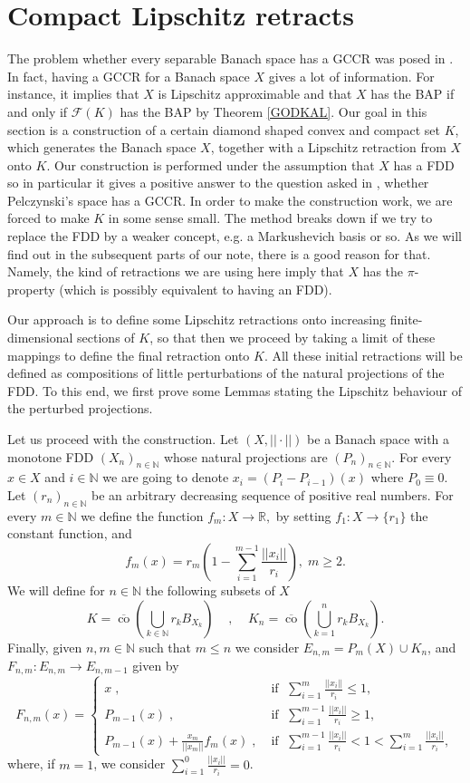 \documentclass[11pt]{amsart}
\newcommand{\N}{\mathbb{N}}
\newcommand{\R}{\mathbb{R}}
\DeclareMathOperator{\co}{co}
\renewcommand{\geq}{\geqslant}
\renewcommand{\leq}{\leqslant}
\newcommand{\<}{\langle}
\renewcommand{\>}{\rangle}
\theoremstyle{definition}
\theoremstyle{remark}
\numberwithin{equation}{section}
\def\R{{\mathbb R}}
\begin{document}
\section{Compact Lipschitz retracts}\label{secretr}

The problem whether every separable Banach space has a GCCR
was posed in \cite{GO14}. In fact, having a GCCR for a Banach space $X$ gives a lot of information. For instance, it implies that $X$ is Lipschitz approximable and that $X$ has the BAP if and only if $\mathcal{F}(K)$ has the BAP by Theorem \ref{GODKAL}. Our goal in this section is a construction of a certain diamond shaped convex and compact set $K$, which generates the Banach space $X$, together with a Lipschitz retraction from $X$ onto $K$. Our construction is performed
under the assumption that $X$ has a FDD so in particular it gives a positive answer to the question asked in \cite{GP19}, whether Pelczynski's space has a GCCR. In order to make the construction work, we
are forced to make $K$ in some sense small. The method breaks down if we try to replace the FDD by
a weaker concept, e.g. a Markushevich basis or so. As we will find out in the subsequent parts of
our note, there is a good reason for that. Namely, the kind of retractions we are using here
imply that $X$ has the $\pi$-property (which is possibly equivalent to having an FDD).

Our approach is to define some Lipschitz retractions onto increasing finite-dimensional sections of $K$, so that then we proceed by taking a limit of these mappings to define the final retraction onto $K$. All these initial retractions will be defined as compositions of little perturbations of the natural projections of the FDD. To this end, we first prove some Lemmas stating the Lipschitz behaviour of the perturbed projections.

Let us proceed with the construction.
Let $(X,||\cdot||)$ be a Banach space with a monotone FDD  $(X_n)_{n\in\N}$ whose natural projections are $(P_n)_{n\in\N}$. For every $x\in X$ and $i\in\N$ we are going to denote $x_i=(P_i-P_{i-1})(x)$ where $P_0\equiv 0$. Let $(r_n)_{n\in \N}$ be an arbitrary decreasing sequence of positive real numbers. For every $m\in\N$  we define the function $f_m:X\rightarrow \R,$ by setting $f_1:X\rightarrow\{r_1\}$ the constant function, and
$$f_m(x)=r_m\left(1-\sum\limits_{i=1}^{m-1}\frac{||x_i||}{r_i}\right),\; m\ge2.$$
We will define for $n\in\N$ the following subsets of $X$
$$K=\overline{\co}\left(\bigcup\limits_{k\in\N}r_kB_{X_k}\right)\;\;\;\;,\;\;\;\;K_n=\overline{\co}\left(\bigcup\limits_{k=1}^nr_kB_{X_k}\right).$$
Finally, given $n,m\in\N$ such that $m\leq n$ we consider $E_{n,m}=P_m(X)\cup K_n$, and $F_{n,m}:E_{n,m}\rightarrow E_{n,m-1}$ given by
$$F_{n,m}(x)=\begin{cases}x\;,\;&\text{if }\;\sum\limits_{i=1}^{m}\frac{||x_i||}{r_i}\leq1,\\
P_{m-1}(x)\;,\;&\text{if }\;\sum\limits_{i=1}^{m-1}\frac{||x_i||}{r_i}\geq1,\\
P_{m-1}(x)+\frac{x_m}{||x_m||}f_m(x)\;,\;&\text{if }\;\sum\limits_{i=1}^{m-1}\frac{||x_i||}{r_i}<1<\sum\limits_{i=1}^{m}\frac{||x_i||}{r_i},\end{cases}$$
where, if $m=1$, we consider $\sum\limits_{i=1}^{0}\frac{||x_i||}{r_i}=0$.
\end{document}
